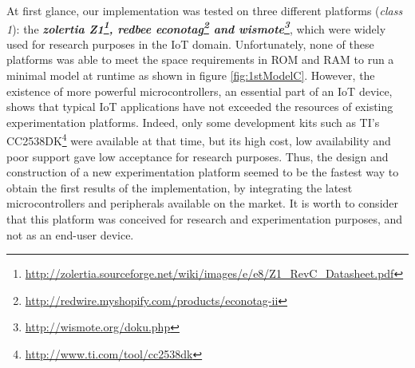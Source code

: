At first glance, our implementation was tested on three different platforms (\textit{class 1}): the \textit{\textbf{zolertia Z1\footnote{\url{http://zolertia.sourceforge.net/wiki/images/e/e8/Z1_RevC_Datasheet.pdf}}, redbee econotag\footnote{\url{http://redwire.myshopify.com/products/econotag-ii}} and wismote\footnote{\url{http://wismote.org/doku.php}}}}, which were widely used for research purposes in the IoT domain.
Unfortunately, none of these platforms was able to meet the space requirements in ROM and RAM to run a minimal model at runtime as shown in figure \ref{fig:1stModelC}.
However, the existence of more powerful microcontrollers, an essential part of an IoT device, shows that typical IoT applications have not exceeded the resources of existing experimentation platforms.
Indeed, only some development kits such as TI's CC2538DK\footnote{\url{http://www.ti.com/tool/cc2538dk}} were available at that time, but its high cost, low availability and poor support gave low acceptance for research purposes.
Thus, the design and construction of a new experimentation platform seemed to be the fastest way to obtain the first results of the implementation, by integrating the latest microcontrollers and peripherals available on the market.
It is worth to consider that this platform was conceived for research and experimentation purposes, and not as an end-user device.

